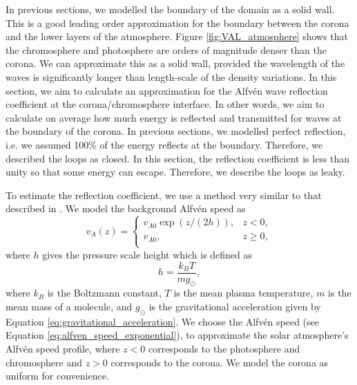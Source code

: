 In previous sections, we modelled the boundary of the domain as a solid wall. This is a good leading order approximation for the boundary between the corona and the lower layers of the atmosphere. Figure \ref{fig:VAL_atmosphere} shows that the chromosphere and photosphere are orders of magnitude denser than the corona. We can approximate this as a solid wall, provided the wavelength of the waves is significantly longer than length-scale of the density variations. In this section, we aim to calculate an approximation for the Alfv\'en wave reflection coefficient at the corona/chromosphere interface. In other words, we aim to calculate on average how much energy is reflected and transmitted for waves at the boundary of the corona. In previous sections, we modelled perfect reflection, i.e. we assumed 100\% of the energy reflects at the boundary.  Therefore, we described the loops as closed. In this section, the reflection coefficient is less than unity so that some energy can escape. Therefore, we describe the loops as leaky.

To estimate the reflection coefficient, we use a method very similar to that described in \citet{Hollweg1984b}. We model the background Alfv\'en speed as 
\begin{equation}
    \label{eq:alfven_speed_exponential}
    v_A(z) = \begin{cases}
    v_{A0}\exp(z/(2h)), & z < 0, \\
    v_{A0}, & z\ge 0, \\
    \end{cases}
\end{equation}
where $h$ gives the pressure scale height which is defined as
\begin{equation}
    \label{eq:pressure_scale_height}
    h = \frac{k_B T}{m g_\odot},
\end{equation}
where $k_B$ is the Boltzmann constant, $T$ is the mean plasma temperature, $m$ is the mean mass of a molecule, and $g_\odot$ is the gravitational acceleration given by Equation \eqref{eq:gravitational_acceleration}. We choose the Alfv\'en speed (see Equation \ref{eq:alfven_speed_exponential}), to approximate the solar atmosphere's Alfv\'en speed profile, where $z<0$ corresponds to the photosphere and chromosphere and $z>0$ corresponds to the corona. We model the corona as uniform for convenience.

